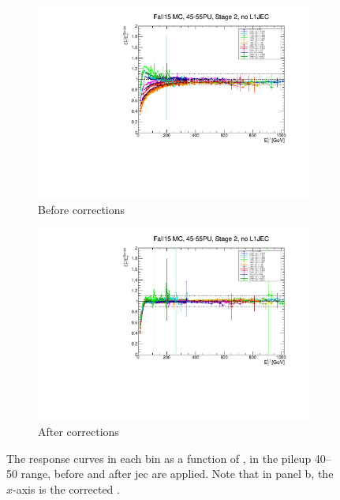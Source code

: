 \begin{figure}[htbp]
    \centering
    \begin{subfigure}[b]{0.45\textwidth}
        \includegraphics[width=\textwidth]{./figures/jecs/response_before.pdf}
        \caption{Before corrections}
        \label{fig:detector_jecs_response_before}
    \end{subfigure}
    \hfill
    \begin{subfigure}[b]{0.45\textwidth}
        \includegraphics[width=\textwidth]{./figures/jecs/response_after.pdf}
        \caption{After corrections}
        \label{fig:detector_jecs_response_after}
    \end{subfigure}
\caption[The response curves in each \abseta bin as a function of \ptLOne, in the pileup 40--50 range, before and after jet energy corrections are applied]{The response curves in each \abseta bin as a function of \ptLOne, in the pileup 40--50 range, before and after \gls{jec} are applied. Note that in panel b, the $x$-axis is the corrected \ptLOne.}
\label{fig:detector_jecs_response}
\end{figure}

